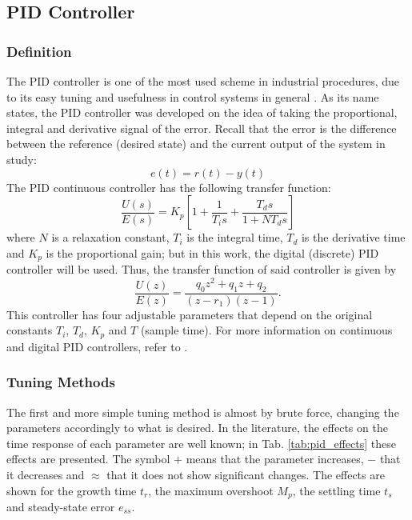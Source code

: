 \subsection{PID Controller}
\subsubsection{Definition}
The PID controller is one of the most used scheme in industrial procedures, due to its easy tuning and usefulness in control systems in general \cite{ogata2010modern}. As its name states, the PID controller was developed on the idea of taking the proportional, integral and derivative signal of the error. Recall that the error is the difference between the reference (desired state) and the current output of the system in study:
\begin{equation}
    e(t)=r(t)-y(t)
\end{equation}
The PID continuous controller has the following transfer function:
\begin{equation}
    \dfrac{U(s)}{E(s)}=K_p\left[1+\dfrac{1}{T_is}+\dfrac{T_ds}{1+NT_ds}\right]
\end{equation}
where $N$ is a relaxation constant, $T_i$ is the integral time, $T_d$ is the derivative time and $K_p$ is the proportional gain; but in this work, the digital (discrete) PID controller will be used. Thus, the transfer function of said controller is given by
\begin{equation}
    \dfrac{U(z)}{E(z)}=\dfrac{q_0z^2+q_1z+q_2}{(z-r_1)(z-1)}.
\end{equation}
This controller has four adjustable parameters that depend on the original constants $T_i$, $T_d$, $K_p$ and $T$ (sample time). For more information on continuous and digital PID controllers, refer to \cite{discretePID}.

\subsubsection{Tuning Methods}\label{sec:tuning}
The first and more simple tuning method is almost by brute force, changing the parameters accordingly to what is desired. In the literature, the effects on the time response of each parameter are well known; in Tab. \ref{tab:pid_effects} these effects are presented. The symbol $+$ means that the parameter increases, $-$ that it decreases and $\approx$ that it does not show significant changes. The effects are shown for the growth time $t_r$, the maximum overshoot $M_p$, the settling time $t_s$ and steady-state error $e_{ss}$.

